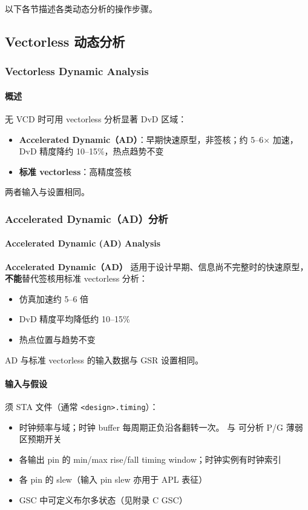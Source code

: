以下各节描述各类动态分析的操作步骤。

\subsection{Vectorless 动态分析}
\subsubsection*{Vectorless Dynamic Analysis}

\paragraph{概述}
无 VCD 时可用 vectorless 分析显著 DvD 区域：
\begin{itemize}
  \item \textbf{Accelerated Dynamic（AD）}：早期快速原型，非签核；约 5--6$\times$ 加速，DvD 精度降约 10--15\%，热点趋势不变
  \item \textbf{标准 vectorless}：高精度签核
\end{itemize}
两者输入与设置相同。
\subsubsection{Accelerated Dynamic（AD）分析}
\paragraph*{Accelerated Dynamic (AD) Analysis}

\textbf{Accelerated Dynamic（AD）} 适用于设计早期、信息尚不完整时的快速原型，\textbf{不能}替代签核用标准 vectorless 分析：
\begin{itemize}
  \item 仿真加速约 5--6 倍
  \item DvD 精度平均降低约 10--15\%
  \item 热点位置与趋势不变
\end{itemize}
AD 与标准 vectorless 的输入数据与 GSR 设置相同。


\paragraph{输入与假设}
须 STA 文件（通常 \texttt{<design>.timing}）：
\begin{itemize}
  \item 时钟频率与域；时钟 buffer 每周期正负沿各翻转一次。 与  可分析 P/G 薄弱区预期开关
  \item 各输出 pin 的 min/max rise/fall timing window；时钟实例有时钟索引
  \item 各 pin 的 slew（输入 pin slew 亦用于 APL 表征）
  \item GSC 中可定义布尔多状态（见附录 C GSC）
\end{itemize}

